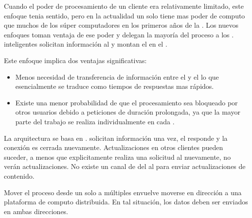Cuando el poder de procesamiento de un cliente era relativamente limitado, este enfoque tenia sentido, pero en la actualidad un solo \smartphone tiene mas poder de computo que muchos de los súper computadores en los primeros años de la \webINT. Los nuevos enfoques toman ventaja de ese poder y delegan la mayoría del proceso a los \clientsAS. \frontEndsAS inteligentes solicitan información al \serverAS y montan el \htmldom en el \browser.

Este enfoque \clientcentric implica dos ventajas significativas:
\begin{itemize}
	\item Menos necesidad de transferencia de información entre el \serverAS y el \clientAS lo que esencialmente se traduce como tiempos de respuestas mas rápidos.
	\item Existe una menor probabilidad de que el procesamiento sea bloqueado por otros usuarios debido a peticiones de duración prolongada, ya que la mayor parte del trabajo se realiza individualmente en cada \clientAS.
\end{itemize}

La arquitectura \clientserver se basa en \statelessconnections. \clientsAS solicitan información una vez, el \serverAS responde y la conexión es cerrada nuevamente. Actualizaciones en otros clientes pueden suceder, a menos que explicitamente realiza una solicitud al \serverAS nuevamente, no verán actualizaciones. No existe un canal de \feedback del \serverAS al \clientAS para enviar actualizaciones de contenido.

Mover el proceso desde un solo \serverAS a múltiples \clientsAS envuelve moverse en dirección a una plataforma de computo distribuida. En tal situación, los datos deben ser enviados en ambas direcciones.

